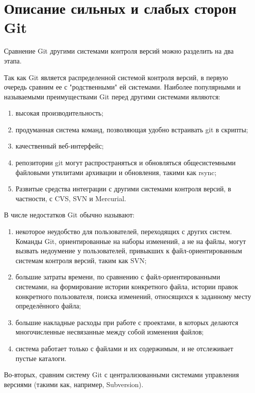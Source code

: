 \documentclass[a4paper,14pt]{report} %
\begin{document}
\section{Описание сильных и слабых сторон Git }
Сравнение Git другими системами контроля версий можно разделить на два этапа. \par
Так как Git является распределенной системой контроля версий, в первую очередь сравним ее с "родственными" ей системами. Наиболее популярными и называемыми преимуществами Git перед другими системами являются:
\begin{enumerate} %
\item высокая производительность;
\item продуманная система команд, позволяющая удобно встраивать git в скрипты;
\item качественный веб-интерфейс;
\item репозитории git могут распространяться и обновляться общесистемными файловыми утилитами архивации и обновления, такими как rsync;
\item Развитые средства интеграции с другими системами контроля версий, в частности, с CVS, SVN и Mercurial.
\end{enumerate}\par
В числе недостатков Git обычно называют:
\begin{enumerate} %
\item некоторое неудобство для пользователей, переходящих с других систем. Команды Git, ориентированные на наборы изменений, а не на файлы, могут вызвать недоумение у пользователей, привыкших к файл-ориентированным системам контроля версий, таким как SVN;
\item большие затраты времени, по сравнению с файл-ориентированными системами, на формирование истории конкретного файла, истории правок конкретного пользователя, поиска изменений, относящихся к заданному месту определённого файла;
\item большие накладные расходы при работе с проектами, в которых делаются многочисленные несвязанные между собой изменения файлов;
\item система работает только с файлами и их содержимым, и не отслеживает пустые каталоги.
\end{enumerate}\par
Во-вторых, сравним систему Git с централизованными системами управления версиями (такими как, например, Subversion).
\end{document}
